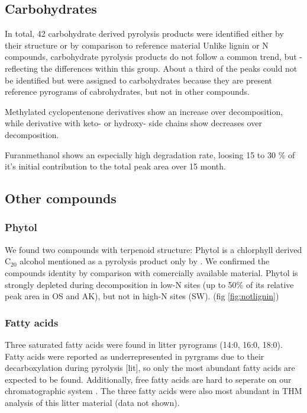 \documentclass[preprint,review,12pt]{elsarticle}
\begin{document}
\subsection{Carbohydrates}
In total, 42 carbohydrate derived pyrolysis products were identified either by their structure or by comparison to reference material %
Unlike lignin or N compounds, carbohydrate pyrolysis products do not follow a common trend, but - reflecting the differences within this group. About a third of the peaks could not be identified but were assigned to carbohydrates because they are present reference pyrograms of cabrohydrates, but not in other compounds.

Methylated cyclopentenone derivatives show an increase over decomposition, while derivative with keto- or hydroxy- side chains show decreases over decomposition.

Furanmethanol shows an especially high degradation rate, loosing 15 to 30 \% of it's initial contribution to the total peak area over 15 month.


\subsection{Other compounds}
\subsubsection{Phytol}
 
We found two compounds with terpenoid structure: Phytol is a chlorphyll derived C$_{20}$ alcohol  mentioned as a pyrolysis product only by \cite{Schwarzinger??}. We confirmed the compounds identity by comparison with comercially available material. Phytol is strongly depleted during decomposition in low-N sites (up to 50\% of its relative peak area in OS and AK), but not in high-N sites (SW). (fig \ref{fig:notlignin})




\subsubsection{Fatty acids}
Three saturated fatty acids were found in litter pyrograms (14:0, 16:0, 18:0). Fatty acids were reported as underrepresented in pyrgrams due to their decarboxylation during pyrolysis [lit], so only the most abundant fatty acids are expected to be found. Additionally, free fatty acids are hard to seperate on our chromatographic system . The three fatty acids were also most abundant in THM analysis of this litter material (data not shown).
\end{document}
